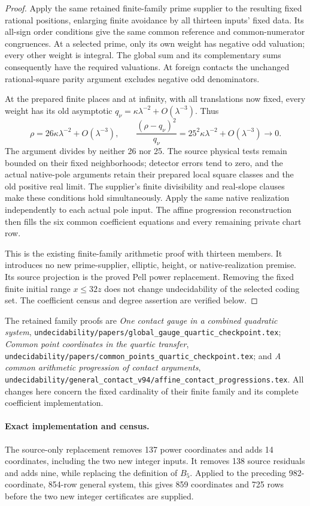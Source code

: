 \begin{proof}
Apply the same retained finite-family prime supplier to the resulting
fixed rational positions, enlarging finite avoidance by all thirteen
inputs' fixed data. Its all-sign order conditions give the same common
reference and common-numerator congruences. At a selected prime,
only its own weight has negative odd valuation; every other weight
is integral. The global sum and its complementary sums consequently
have the required valuations. At foreign contacts the unchanged
rational-square parity argument excludes negative odd denominators.

At the prepared finite places and at infinity, with all translations
now fixed, every weight has its old asymptotic
\(q_\nu=\kappa\lambda^{-2}+O(\lambda^{-3})\). Thus
\[
 \rho=26\kappa\lambda^{-2}+O(\lambda^{-3}),\qquad
 \frac{(\rho-q_\nu)^2}{q_\nu}
       =25^2\kappa\lambda^{-2}+O(\lambda^{-3})\longrightarrow0.
\]
The argument divides by neither 26 nor 25. The source physical tests
remain bounded on their fixed neighborhoods; detector errors tend to
zero, and the actual native-pole arguments retain their prepared
local square classes and the old positive real limit. The supplier's
finite divisibility and real-slope clauses make these conditions hold
simultaneously. Apply the same native realization independently to
each actual pole input. The affine progression reconstruction then
fills the six common coefficient equations and every remaining
private chart row.

This is the existing finite-family arithmetic proof with thirteen
members. It introduces no new prime-supplier, elliptic, height, or
native-realization premise. Its source projection is the proved Pell
power replacement. Removing the fixed finite initial range
\(x\le32z\) does not change undecidability of the selected coding
set. The coefficient census and degree assertion are verified below.
\end{proof}

The retained family proofs are
\emph{One contact gauge in a combined quadratic system},
\nolinkurl{undecidability/papers/global_gauge_quartic_checkpoint.tex};
\emph{Common point coordinates in the quartic transfer},
\nolinkurl{undecidability/papers/common_points_quartic_checkpoint.tex};
and \emph{A common arithmetic progression of contact arguments},
\nolinkurl{undecidability/general_contact_v94/affine_contact_progressions.tex}.
All changes here concern the fixed cardinality of their finite family
and its complete coefficient implementation.

\paragraph{Exact implementation and census.}
The source-only replacement removes 137 power coordinates and adds
14 coordinates, including the two new integer inputs. It removes
138 source residuals and adds nine, while replacing the definition
of \(B_5\). Applied to the preceding 982-coordinate, 854-row
general system, this gives 859 coordinates and 725 rows before the
two new integer certificates are supplied.

